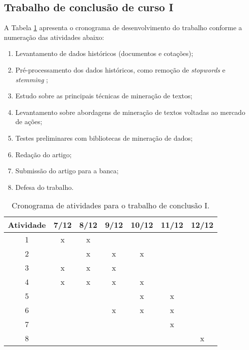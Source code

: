 \documentclass[11pt,a4paper]{article}
\begin{document}
\subsection{Trabalho de conclusão de curso I}

A Tabela \ref{tab:cronograma1} apresenta o cronograma de desenvolvimento do trabalho conforme a numeração das atividades abaixo:
\begin{enumerate}
  \item Levantamento de dados históricos (documentos e cotações);
  \item Pré-processamento dos dados históricos, como remoção de \textit{stopwords} e \textit{stemming} \cite{Weiss:textMining,orengo_stemming};
  \item Estudo sobre as principais técnicas de mineração de textos;
  \item Levantamento sobre abordagens de mineração de textos voltadas ao mercado de ações;
  \item Testes preliminares com bibliotecas de mineração de dados;
  \item Redação do artigo;
  \item Submissão do artigo para a banca;
  \item Defesa do trabalho.
\end{enumerate}

\begin{table}[h]
  \begin{center}
    \caption{Cronograma de atividades para o trabalho de conclusão I. \label{tab:cronograma1}}
    \begin{tabular}{|c|c|c|c|c|c|c|}
      \hline
      \bf Atividade & \bf 7/12 & \bf 8/12 & \bf 9/12 & \bf 10/12 & \bf 11/12 & \bf 12/12  \\  \hline \hline
      1 & x & x &   &   &   &   \\ \hline
      2 &   & x & x & x &   &   \\ \hline
      3 & x & x & x &   &   &   \\ \hline
      4 & x & x & x & x &   &   \\ \hline
      5 &   &   &   & x & x &   \\ \hline
      6 &   &   & x & x & x &   \\ \hline
      7 &   &   &   &   & x &   \\ \hline
      8 &   &   &   &   &   & x \\ \hline
    \end{tabular}
  \end{center}
\end{table}
\end{document}
